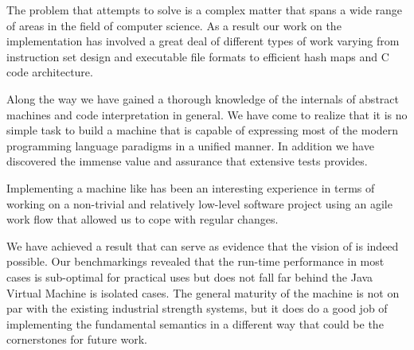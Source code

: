 The problem that \thename{} attempts to solve is a complex matter that spans a
wide range of areas in the field of computer science. As a result our work on
the implementation has involved a great deal of different types of work varying
from instruction set design and executable file formats to efficient hash maps
and C code architecture.

Along the way we have gained a thorough knowledge of the internals of abstract
machines and code interpretation in general. We have come to realize that it is
no simple task to build a machine that is capable of expressing most of the
modern programming language paradigms in a unified manner. In addition we have
discovered the immense value and assurance that extensive tests provides.

Implementing a machine like \thename{} has been an interesting experience in
terms of working on a non-trivial and relatively low-level software project
using an agile work flow that allowed us to cope with regular changes.

We have achieved a result that can serve as evidence that the vision of
\thename{} is indeed possible. Our benchmarkings revealed that the run-time
performance in most cases is sub-optimal for practical uses but does not fall
far behind the Java Virtual Machine is isolated cases. The general maturity of
the machine is not on par with the existing industrial strength systems, but it
does do a good job of implementing the fundamental semantics in a different way
that could be the cornerstones for future work.

